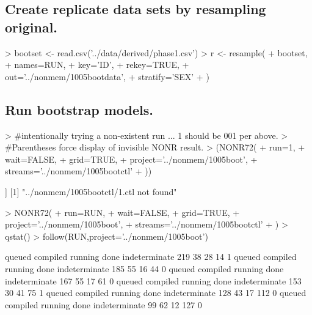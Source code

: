 \subsection{Create replicate data sets by resampling original.}
\begin{Schunk}
\begin{Sinput}
>  bootset <- read.csv('../data/derived/phase1.csv')
>  r <- resample(
+  	bootset,
+  	names=RUN,
+  	key='ID',
+  	rekey=TRUE,
+  	out='../nonmem/1005bootdata',
+  	stratify='SEX'
+  )
\end{Sinput}
\end{Schunk}
\subsection{Run bootstrap models.}
\begin{Schunk}
\begin{Sinput}
> #intentionally trying a non-existent run ... 1 should be 001 per above. 
> #Parentheses force display of invisible NONR result.
> (NONR72(
+      run=1,
+      wait=FALSE,
+      grid=TRUE,
+      project='../nonmem/1005boot',
+      streams='../nonmem/1005bootctl'
+ ))
\end{Sinput}
\begin{Soutput}
[[1]]
[1] "../nonmem/1005bootctl/1.ctl not found"
\end{Soutput}
\begin{Sinput}
> NONR72(
+      run=RUN,
+      wait=FALSE,
+      grid=TRUE,
+      project='../nonmem/1005boot',
+      streams='../nonmem/1005bootctl'
+ )
> qstat()
> follow(RUN,project='../nonmem/1005boot')
\end{Sinput}
\begin{Soutput}
       queued      compiled       running          done indeterminate 
          219            38            28            14             1 
       queued      compiled       running          done indeterminate 
          185            55            16            44             0 
       queued      compiled       running          done indeterminate 
          167            55            17            61             0 
       queued      compiled       running          done indeterminate 
          153            30            41            75             1 
       queued      compiled       running          done indeterminate 
          128            43            17           112             0 
       queued      compiled       running          done indeterminate 
           99            62            12           127             0 

\end{Soutput}
\end{Schunk}
